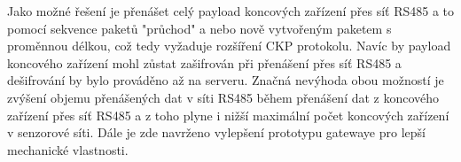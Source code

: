 Jako možné řešení je přenášet celý payload koncových zařízení přes síť RS485 a to pomocí sekvence paketů "průchod" a nebo nově vytvořeným paketem s proměnnou délkou, což tedy vyžaduje rozšíření CKP protokolu. Navíc by payload koncového zařízení mohl zůstat zašifrován při přenášení přes síť RS485 a dešifrování by bylo prováděno až na serveru.
Značná nevýhoda obou možností je zvýšení objemu přenášených dat v síti RS485 během přenášení dat z koncového zařízení přes síť RS485 a z toho plyne i nižší maximální počet koncových zařízení v senzorové síti.
Dále je zde navrženo vylepšení prototypu gatewaye pro lepší mechanické vlastnosti.













